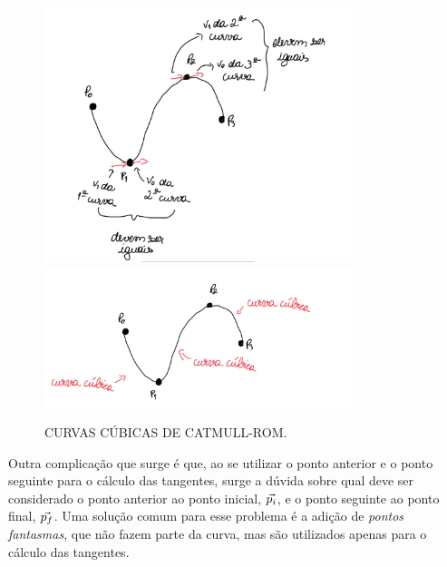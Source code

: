 \begin{figure}[h!]
    \caption{CURVAS CÚBICAS DE CATMULL-ROM.}
    \centering
    \includegraphics[width=0.8\textwidth]{fig/s1.jpg}
    \vspace{0.5em} %
    \includegraphics[width=0.8\textwidth]{fig/s2.jpg}
    \label{fig:spline_tangentes}
\end{figure}


Outra complicação que surge é que, ao se utilizar o ponto anterior e o ponto seguinte para o cálculo das tangentes, surge a dúvida sobre qual deve ser considerado o ponto anterior ao ponto inicial, ${\vec{p_i}}$, e o ponto seguinte ao ponto final, ${\vec{p_f}}$. Uma solução comum para esse problema é a adição de \textit{pontos fantasmas}, que não fazem parte da curva, mas são utilizados apenas para o cálculo das tangentes.


